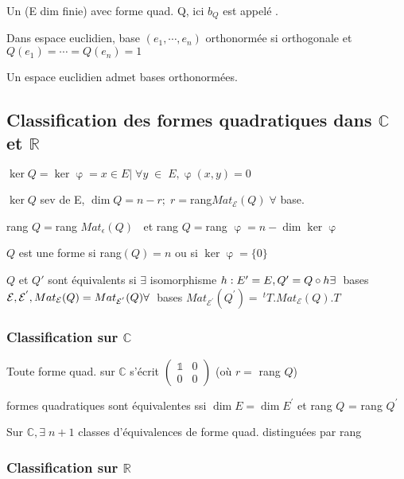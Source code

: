 \documentclass[11pt]{article} %
\begin{document}
 Un  (E dim finie) avec forme quad. Q, ici $b_Q$ est appelé .

 Dans espace euclidien, base $ (e_1, \cdots , e_n) $ orthonormée si orthogonale et $Q(e_1) = \cdots = Q(e_n)= 1$

\corollaire Un espace euclidien admet bases orthonormées.

\subsection{Classification des formes quadratiques dans $\mathbb{C}$ et $\mathbb{R}$}

 $ \ker Q = \ker \upvarphi = {x \in E | \; \forall y \; \in \; E, \upvarphi(x,y)=0}$

\lemme $ \ker Q $ sev de E, $ \dim Q = n-r; \; r=$rang$ Mat_{\mathcal{E} }(Q) \; \forall$ base.

 rang $  Q= $rang $ Mat_{\epsilon}(Q) \; \; $ et $ $rang $ Q = $rang $ \upvarphi = n - \dim \ker \upvarphi $

 $Q$ est une forme  si rang$ (Q)=n$ ou si $ \ker \upvarphi = \{0 \}$

 $Q $ et $Q'$ sont équivalents si $ \exists $ isomorphisme $ h: E'=E, Q'=Q \circ h \\ \exists \; $ bases $ \mathcal{E}, \mathcal{E}^{'}, Mat_{\mathcal{E}}(Q)=Mat_{\mathcal{E}^{'}}(Q) \\ \forall \; $ bases $ Mat_{\mathcal{E}^{'}}(Q^{'})= ~^t{T}. Mat_{\mathcal{E}}(Q). T$

\subsubsection{Classification sur $\mathbb{C}$}

\theoreme Toute forme quad. sur $\mathbb{C}$ s'écrit $ \begin{pmatrix}
\mathds{1} & 0\\
0 & 0
\end{pmatrix}$
(où $r=$ rang $Q$)

 formes quadratiques sont équivalentes ssi $ \dim E = \dim E^{'} $ et rang $Q$ = rang $Q^{'}$

\proposition Sur $\mathbb{C}, \exists \; n+1$ classes d'équivalences de forme quad. distinguées par rang

\subsubsection{Classification sur $\mathbb{R}$}
\end{document}
